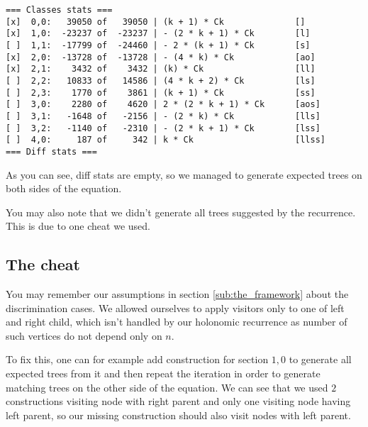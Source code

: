 \documentclass[final]{article}
\theoremstyle{definition}
\theoremstyle{remark}
\begin{document}
\begin{lstlisting}
=== Classes stats ===
[x]  0,0:   39050 of   39050 | (k + 1) * Ck              []
[x]  1,0:  -23237 of  -23237 | - (2 * k + 1) * Ck        [l]
[ ]  1,1:  -17799 of  -24460 | - 2 * (k + 1) * Ck        [s]
[x]  2,0:  -13728 of  -13728 | - (4 * k) * Ck            [ao]
[x]  2,1:    3432 of    3432 | (k) * Ck                  [ll]
[ ]  2,2:   10833 of   14586 | (4 * k + 2) * Ck          [ls]
[ ]  2,3:    1770 of    3861 | (k + 1) * Ck              [ss]
[ ]  3,0:    2280 of    4620 | 2 * (2 * k + 1) * Ck      [aos]
[ ]  3,1:   -1648 of   -2156 | - (2 * k) * Ck            [lls]
[ ]  3,2:   -1140 of   -2310 | - (2 * k + 1) * Ck        [lss]
[ ]  4,0:     187 of     342 | k * Ck                    [llss]
=== Diff stats ===
\end{lstlisting}

As you can see, diff stats are empty, so we managed to generate expected trees on both sides of the equation.

You may also note that we didn't generate all trees suggested by the recurrence. This is due to one cheat we used.

\subsection{The cheat}%
\label{sub:the_cheat}

You may remember our assumptions in section \ref{sub:the_framework} about the discrimination cases. We allowed ourselves to apply visitors only to one of left and right child, which isn't handled by our holonomic recurrence as number of such vertices do not depend only on \(n\).

To fix this, one can for example add construction for section \(1, 0\) to generate all expected trees from it and then repeat the iteration in order to generate matching trees on the other side of the equation. We can see that we used \(2\) constructions visiting node with right parent and only one visiting node having left parent, so our missing construction should also visit nodes with left parent.
\end{document}

